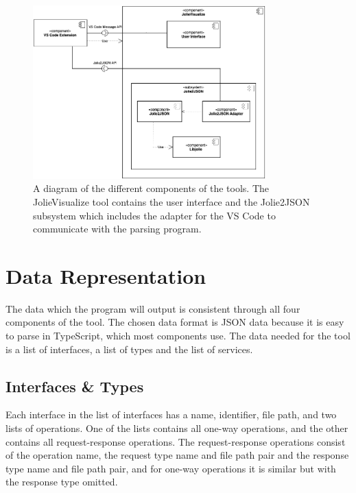 \begin{figure}[t]
    \center
    \includegraphics[width=0.80\textwidth]{figures/component_diagram.png}
    \caption{A diagram of the different components of the tools. The JolieVisualize tool contains the user interface and the Jolie2JSON subsystem which includes the adapter for the VS Code to communicate with the parsing program.}
    \label{figure:comp_diagram}
\end{figure}

\section{Data Representation}
The data which the \javatoolname[] program will output is consistent through all
four components of the tool. The chosen data format is JSON data because it is easy to parse in TypeScript, which most components use.
The data needed for the tool is a list of interfaces, a list of types and the list of services.

\subsection{Interfaces \& Types}
Each interface in the list of interfaces has a name, identifier, file path, and two lists of operations.
One of the lists contains all one-way operations, and the other contains all request-response operations.
The request-response operations consist of the operation name, the request type name and file path pair and the response type name and file path pair, and for one-way operations it is similar but with the response type omitted.

